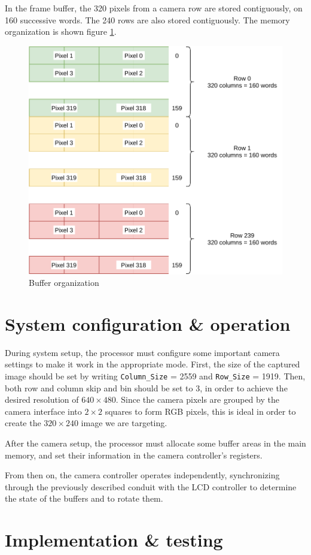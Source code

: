 \documentclass[12pt,a4paper]{article}
\begin{document}
In the frame buffer, the 320 pixels from a camera row are stored contiguously, on 160 successive words. The 240 rows are also stored contiguously. The memory organization is shown figure \ref{fig:buffer}.

\begin{figure}[h]
	\centering
	\includegraphics[width=.7\textwidth]{figures/buffer}
	\caption{Buffer organization}
	\label{fig:buffer}
\end{figure}


\section{System configuration \& operation}

During system setup, the processor must configure some important camera settings to make it work in the appropriate mode. First, the size of the captured image should be set by writing \texttt{Column\_Size} = 2559 and \texttt{Row\_Size} = 1919. Then, both row and column skip and bin should be set to 3, in order to achieve the desired resolution of $640 \times 480$. Since the camera pixels are grouped by the camera interface into $2 \times 2$ squares to form RGB pixels, this is ideal in order to create the $320 \times 240$ image we are targeting.

After the camera setup, the processor must allocate some buffer areas in the main memory, and set their information in the camera controller's registers.

From then on, the camera controller operates independently, synchronizing through the previously described conduit with the LCD controller to determine the state of the buffers and to rotate them.


\section{Implementation \& testing}
\end{document}
